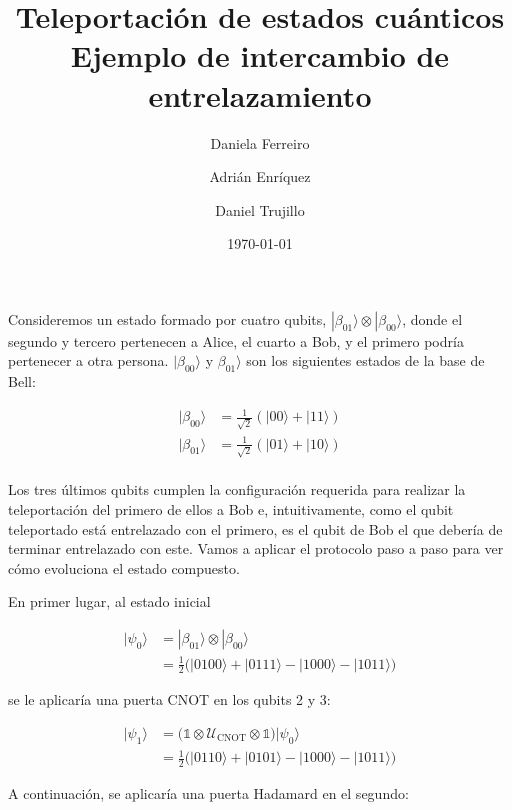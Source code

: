 \documentclass{article}
\title{%
  Teleportación de estados cuánticos \\ 
  \large Ejemplo de intercambio de entrelazamiento
}
\author{
  Daniela Ferreiro \and 
  Adrián Enríquez \and 
  Daniel Trujillo
}
\date{\today}
\begin{document}
\maketitle

Consideremos un estado formado por cuatro qubits,
$|\beta_{01}\rangle \otimes |\beta_{00}\rangle$, donde el segundo
y tercero pertenecen a Alice, el cuarto a Bob, y el primero podría
pertenecer a otra persona. $|\beta_{00}\rangle$
y $\beta_{01}\rangle$ son los siguientes estados de la base de Bell:

\begin{align*}
  |\beta_{00}\rangle &= 
    \frac{1}{\sqrt{2}}(|00\rangle + |11\rangle) \\
  |\beta_{01}\rangle &= 
    \frac{1}{\sqrt{2}}(|01\rangle + |10\rangle) \\
\end{align*}

Los tres últimos qubits cumplen la configuración requerida para
realizar la teleportación del primero de ellos a Bob e,
intuitivamente, como el qubit teleportado está entrelazado con el
primero, es el qubit de Bob el que debería de terminar entrelazado
con este. Vamos a aplicar el protocolo paso a paso para ver cómo
evoluciona el estado compuesto.

En primer lugar, al estado inicial

\begin{align*}
  |\psi_0\rangle &= |\beta_{01}\rangle \otimes |\beta_{00}\rangle \\ 
         &= \frac{1}{2}\Big(
            |0100\rangle + |0111\rangle - |1000\rangle - |1011\rangle
         \Big)
\end{align*}

se le aplicaría una puerta CNOT en los qubits 2 y 3:

\begin{align*}
  |\psi_1\rangle 
        &= \Big(
          \mathbb{1} 
          \otimes \mathcal{U} _\text{CNOT}
          \otimes \mathbb{1}
          \Big)|\psi_0\rangle \\ 
        &= \frac{1}{2}\Big(
          |0110\rangle + |0101\rangle - |1000\rangle - |1011\rangle
        \Big)
\end{align*}

A continuación, se aplicaría una puerta Hadamard en el segundo:
\end{document}
